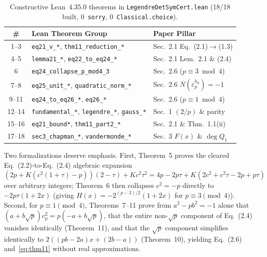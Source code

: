 \documentclass[10pt,twocolumn]{article}
\begin{document}
\begin{table}[t]
\centering
\scriptsize
\setlength{\tabcolsep}{2.3pt}
\caption{Constructive Lean~4.35.0 theorems in \texttt{LegendreDetSymCert.lean} (18/18 built, 0~\texttt{sorry}, 0~\texttt{Classical.choice}).}
\label{tab:lean}
\begin{tabular}{@{}cll@{}}
\toprule
\# & Lean Theorem Group & Paper Pillar~\cite{LeLanLiu2026} \\
\midrule
1--3 & \texttt{eq21\_v\_*}, \texttt{thm11\_reduction\_*} & Sec.~2.1 Eq.~(2.1)$\to$(1.3) \\
4--5 & \texttt{lemma21\_*}, \texttt{eq22\_to\_eq24\_*} & Sec.~2.1 Lem.~2.1 \& (2.4) \\
6 & \texttt{eq24\_collapse\_p\_mod4\_3} & Sec.~2.6 ($p\equiv 3\bmod 4$) \\
7--8 & \texttt{eq25\_unit\_*}, \texttt{quadratic\_norm\_*} & Sec.~2.6 $N(\varepsilon_p^{h_p})=-1$ \\
9--11 & \texttt{eq24\_to\_eq26\_*}, \texttt{eq26\_*} & Sec.~2.6 ($p\equiv 1\bmod 4$) \\
12--14 & \texttt{fundamental\_*}, \texttt{legendre\_*}, \texttt{gauss\_*} & Sec.~1 $(2/p)$ \& parity \\
15--16 & \texttt{eq21\_bound*}, \texttt{thm11\_part2\_*} & Sec.~2.1 \& Thm.~1.1(ii) \\
17--18 & \texttt{sec3\_chapman\_*}, \texttt{vandermonde\_*} & Sec.~3 $F(x)$ \& $\deg Q_1$ \\
\bottomrule
\end{tabular}
\end{table}

Two formalizations deserve emphasis. First, Theorem~5 proves the cleared Eq.~(2.2)-to-Eq.~(2.4) algebraic expansion $(2p + K(c^2(1+\tau)-p))(2-\tau) + Kc^2\tau^2 = 4p - 2p\tau + K(2c^2 + c^2\tau - 2p + p\tau)$ over arbitrary integers; Theorem~6 then collapses $c^2=-p$ directly to $-2p\tau(1+2x)$ (giving $H(x) = -2^{(p-3)/2}(1+2x)$ for $p\equiv 3\pmod 4$). Second, for $p\equiv 1\pmod 4$, Theorems~7--11 prove from $a^2 - pb^2 = -1$ alone that $(a+b\sqrt{p})c_p^2 = p(-a+b\sqrt{p})$, that the entire non-$\sqrt{p}$ component of Eq.~(2.4) vanishes identically (Theorem~11), and that the $\sqrt{p}$ component simplifies identically to $2((pb-2a)x + (2b-a))$ (Theorem~10), yielding Eq.~(2.6) and~\eqref{eq:thm11} without real approximations.
\end{document}
